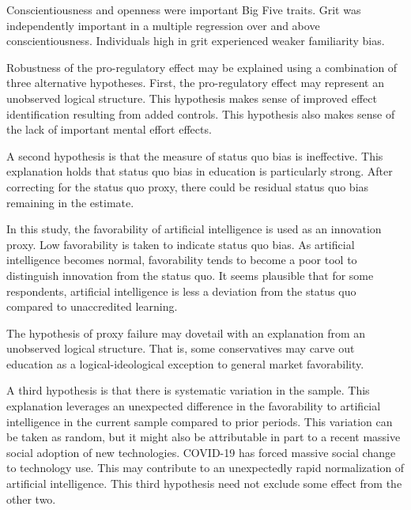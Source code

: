 \documentclass[review]{elsarticle}
\begin{document}
Conscientiousness and openness were important Big Five traits.
Grit was independently important in a multiple regression over and above conscientiousness.
Individuals high in grit experienced weaker familiarity bias.


Robustness of the pro-regulatory effect may be explained using a combination of three alternative hypotheses.
First, the pro-regulatory effect may represent an unobserved logical structure.
This hypothesis makes sense of improved effect identification resulting from added controls.
This hypothesis also makes sense of the lack of important mental effort effects.

A second hypothesis is that the measure of status quo bias is ineffective.
This explanation holds that status quo bias in education is particularly strong.
After correcting for the status quo proxy, there could be residual status quo bias remaining in the estimate.

In this study, the favorability of artificial intelligence is used as an innovation proxy.
Low favorability is taken to indicate status quo bias.
As artificial intelligence becomes normal,
favorability tends to become a poor tool to distinguish innovation from the status quo.
It seems plausible that for some respondents,
artificial intelligence is less a deviation from the status quo
compared to unaccredited learning.

The hypothesis of proxy failure may dovetail with an explanation from an unobserved logical structure.
That is, some conservatives may carve out education as a logical-ideological exception to general market favorability.

A third hypothesis is that there is systematic variation in the sample.
This explanation leverages an unexpected difference in the favorability to artificial intelligence
in the current sample compared to prior periods.
This variation can be taken as random,
but it might also be attributable in part to a recent massive social adoption of new technologies.
COVID-19 has forced massive social change to technology use.
This may contribute to an unexpectedly rapid normalization of artificial intelligence.
This third hypothesis need not exclude some effect from the other two.
\end{document}
